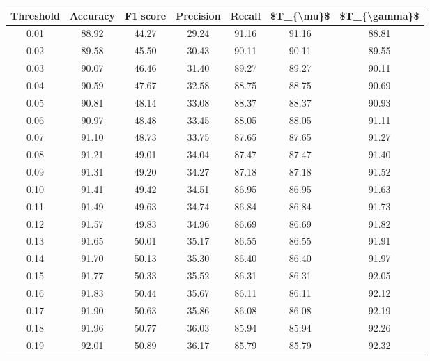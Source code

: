 \begin{tabular}{|c|c|c|c|c|c|c|}
\hline
 Threshold &  Accuracy &  F1 score &  Precision &  Recall &  \$T\_\{\textbackslash mu\}\$ &  \$T\_\{\textbackslash gamma\}\$ \\
\hline
      0.01 &     88.92 &     44.27 &      29.24 &   91.16 &      91.16 &         88.81 \\
      0.02 &     89.58 &     45.50 &      30.43 &   90.11 &      90.11 &         89.55 \\
      0.03 &     90.07 &     46.46 &      31.40 &   89.27 &      89.27 &         90.11 \\
      0.04 &     90.59 &     47.67 &      32.58 &   88.75 &      88.75 &         90.69 \\
      0.05 &     90.81 &     48.14 &      33.08 &   88.37 &      88.37 &         90.93 \\
      0.06 &     90.97 &     48.48 &      33.45 &   88.05 &      88.05 &         91.11 \\
      0.07 &     91.10 &     48.73 &      33.75 &   87.65 &      87.65 &         91.27 \\
      0.08 &     91.21 &     49.01 &      34.04 &   87.47 &      87.47 &         91.40 \\
      0.09 &     91.31 &     49.20 &      34.27 &   87.18 &      87.18 &         91.52 \\
      0.10 &     91.41 &     49.42 &      34.51 &   86.95 &      86.95 &         91.63 \\
      0.11 &     91.49 &     49.63 &      34.74 &   86.84 &      86.84 &         91.73 \\
      0.12 &     91.57 &     49.83 &      34.96 &   86.69 &      86.69 &         91.82 \\
      0.13 &     91.65 &     50.01 &      35.17 &   86.55 &      86.55 &         91.91 \\
      0.14 &     91.70 &     50.13 &      35.30 &   86.40 &      86.40 &         91.97 \\
      0.15 &     91.77 &     50.33 &      35.52 &   86.31 &      86.31 &         92.05 \\
      0.16 &     91.83 &     50.44 &      35.67 &   86.11 &      86.11 &         92.12 \\
      0.17 &     91.90 &     50.63 &      35.86 &   86.08 &      86.08 &         92.19 \\
      0.18 &     91.96 &     50.77 &      36.03 &   85.94 &      85.94 &         92.26 \\
      0.19 &     92.01 &     50.89 &      36.17 &   85.79 &      85.79 &         92.32 \\

\end{tabular}
